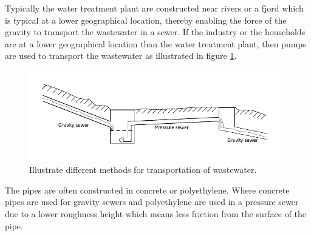 Typically the water treatment plant are constructed near rivers or a fjord which is typical at a lower geographical location, thereby enabling the force of the gravity to transport the wastewater in a sewer. If the industry or the households are at a lower geographical location than the water treatment plant, then pumps are used to transport the wastewater as illustrated in figure \ref{fig:Sewer_drawing}.
\begin{figure}[H]
\centering
\includegraphics[width=1\textwidth]{report/introduction/pictures/Sewer_drawing.pdf}
\caption{Illustrate different methods for transportation of wastewater.}
\label{fig:Sewer_drawing}
\end{figure}

The pipes are often constructed in concrete or polyethylene. Where concrete pipes are used for gravity sewers and polyethylene are used in a pressure sewer due to a lower roughness height which means less friction from the surface of the pipe. 